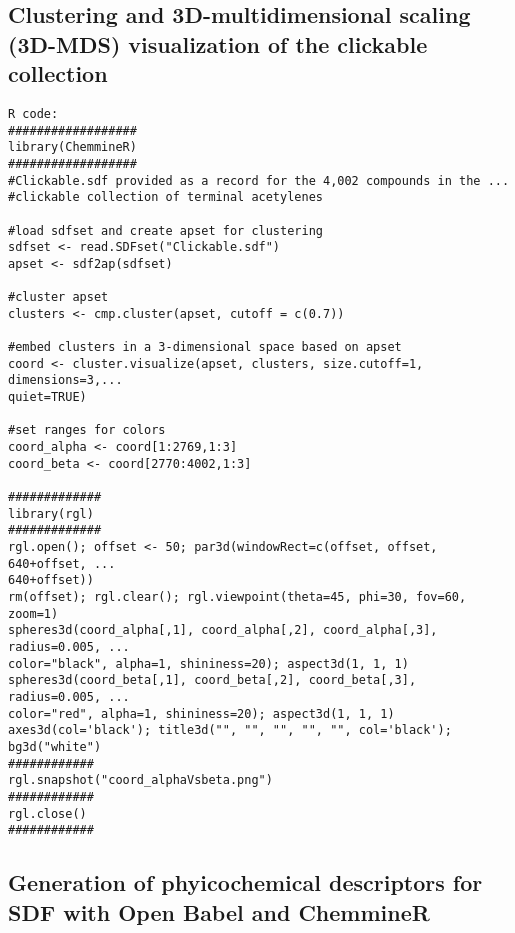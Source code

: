 \subsection{Clustering and 3D-multidimensional scaling (3D-MDS) visualization of the clickable collection}
\begin{verbatim}
R code:
##################
library(ChemmineR)
##################
#Clickable.sdf provided as a record for the 4,002 compounds in the ...
#clickable collection of terminal acetylenes

#load sdfset and create apset for clustering
sdfset <- read.SDFset("Clickable.sdf")
apset <- sdf2ap(sdfset)

#cluster apset
clusters <- cmp.cluster(apset, cutoff = c(0.7))

#embed clusters in a 3-dimensional space based on apset
coord <- cluster.visualize(apset, clusters, size.cutoff=1, dimensions=3,...
quiet=TRUE)

#set ranges for colors
coord_alpha <- coord[1:2769,1:3]
coord_beta <- coord[2770:4002,1:3]

#############
library(rgl)
#############
rgl.open(); offset <- 50; par3d(windowRect=c(offset, offset, 640+offset, ...
640+offset))
rm(offset); rgl.clear(); rgl.viewpoint(theta=45, phi=30, fov=60, zoom=1)
spheres3d(coord_alpha[,1], coord_alpha[,2], coord_alpha[,3], radius=0.005, ...
color="black", alpha=1, shininess=20); aspect3d(1, 1, 1)
spheres3d(coord_beta[,1], coord_beta[,2], coord_beta[,3], radius=0.005, ...
color="red", alpha=1, shininess=20); aspect3d(1, 1, 1)
axes3d(col='black'); title3d("", "", "", "", "", col='black'); bg3d("white")  
############
rgl.snapshot("coord_alphaVsbeta.png")
############
rgl.close()
############
\end{verbatim}
\clearpage

\subsection{Generation of phyicochemical descriptors for SDF with Open Babel and ChemmineR}

